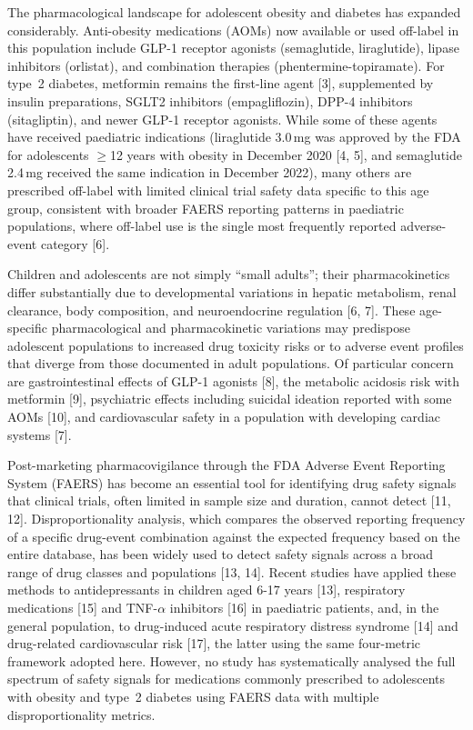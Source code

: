\documentclass[10pt,a4paper]{article}
\begin{document}
The pharmacological landscape for adolescent obesity and diabetes has expanded considerably. Anti-obesity medications (AOMs) now available or used off-label in this population include GLP-1 receptor agonists (semaglutide, liraglutide), lipase inhibitors (orlistat), and combination therapies (phentermine-topiramate). For type~2 diabetes, metformin remains the first-line agent [3], supplemented by insulin preparations, SGLT2 inhibitors (empagliflozin), DPP-4 inhibitors (sitagliptin), and newer GLP-1 receptor agonists. While some of these agents have received paediatric indications (liraglutide 3.0\,mg was approved by the FDA for adolescents $\geq$12 years with obesity in December 2020 [4, 5], and semaglutide 2.4\,mg received the same indication in December 2022), many others are prescribed off-label with limited clinical trial safety data specific to this age group, consistent with broader FAERS reporting patterns in paediatric populations, where off-label use is the single most frequently reported adverse-event category [6].

Children and adolescents are not simply ``small adults''; their pharmacokinetics differ substantially due to developmental variations in hepatic metabolism, renal clearance, body composition, and neuroendocrine regulation [6, 7]. These age-specific pharmacological and pharmacokinetic variations may predispose adolescent populations to increased drug toxicity risks or to adverse event profiles that diverge from those documented in adult populations. Of particular concern are gastrointestinal effects of GLP-1 agonists [8], the metabolic acidosis risk with metformin [9], psychiatric effects including suicidal ideation reported with some AOMs [10], and cardiovascular safety in a population with developing cardiac systems [7].

Post-marketing pharmacovigilance through the FDA Adverse Event Reporting System (FAERS) has become an essential tool for identifying drug safety signals that clinical trials, often limited in sample size and duration, cannot detect [11, 12]. Disproportionality analysis, which compares the observed reporting frequency of a specific drug-event combination against the expected frequency based on the entire database, has been widely used to detect safety signals across a broad range of drug classes and populations [13, 14]. Recent studies have applied these methods to antidepressants in children aged 6-17 years [13], respiratory medications [15] and TNF-$\alpha$ inhibitors [16] in paediatric patients, and, in the general population, to drug-induced acute respiratory distress syndrome [14] and drug-related cardiovascular risk [17], the latter using the same four-metric framework adopted here. However, no study has systematically analysed the full spectrum of safety signals for medications commonly prescribed to adolescents with obesity and type~2 diabetes using FAERS data with multiple disproportionality metrics.
\end{document}

